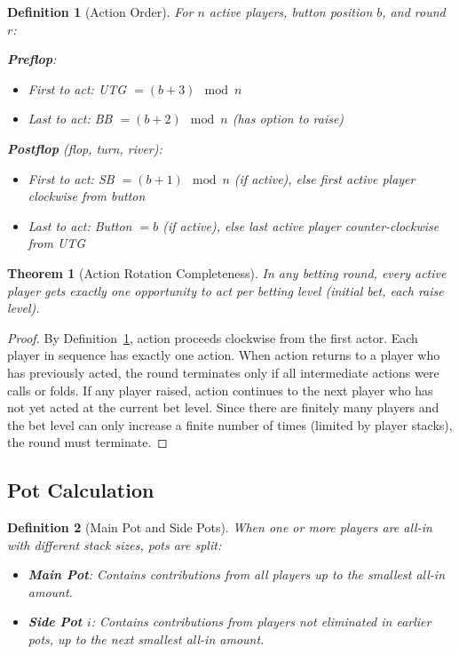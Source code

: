 \documentclass[11pt,a4paper]{article}
\newtheorem{definition}{Definition}[section]
\newtheorem{theorem}{Theorem}[section]
\begin{document}
\begin{definition}[Action Order]
\label{def:action-order}
For $n$ active players, button position $b$, and round $r$:

\textbf{Preflop}:
\begin{itemize}
    \item First to act: UTG $= (b + 3) \mod n$
    \item Last to act: BB $= (b + 2) \mod n$ (has option to raise)
\end{itemize}

\textbf{Postflop} (flop, turn, river):
\begin{itemize}
    \item First to act: SB $= (b + 1) \mod n$ (if active), else first active player clockwise from button
    \item Last to act: Button $= b$ (if active), else last active player counter-clockwise from UTG
\end{itemize}
\end{definition}

\begin{theorem}[Action Rotation Completeness]
\label{thm:action-completeness}
In any betting round, every active player gets exactly one opportunity to act per betting level (initial bet, each raise level).
\end{theorem}

\begin{proof}
By Definition~\ref{def:action-order}, action proceeds clockwise from the first actor. Each player in sequence has exactly one action. When action returns to a player who has previously acted, the round terminates only if all intermediate actions were calls or folds. If any player raised, action continues to the next player who has not yet acted at the current bet level. Since there are finitely many players and the bet level can only increase a finite number of times (limited by player stacks), the round must terminate.
\end{proof}

\subsection{Pot Calculation}

\begin{definition}[Main Pot and Side Pots]
\label{def:sidepots}
When one or more players are all-in with different stack sizes, pots are split:
\begin{itemize}
    \item \textbf{Main Pot}: Contains contributions from all players up to the smallest all-in amount.
    \item \textbf{Side Pot $i$}: Contains contributions from players not eliminated in earlier pots, up to the next smallest all-in amount.
\end{itemize}
\end{definition}
\end{document}
